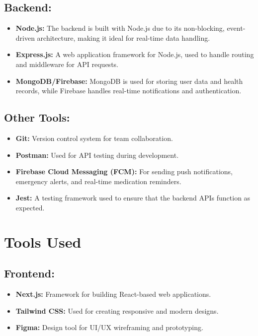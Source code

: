 \subsection*{Backend:}
\begin{itemize}
    \item \textbf{Node.js:} The backend is built with Node.js due to its non-blocking, event-driven architecture, making it ideal for real-time data handling\cite{nodejs_docs}.
    \item \textbf{Express.js:} A web application framework for Node.js, used to handle routing and middleware for API requests\cite{express_docs}.
    \item \textbf{MongoDB/Firebase:} MongoDB is used for storing user data and health records, while Firebase handles real-time notifications and authentication\cite{mongodb_docs}.
\end{itemize}

\subsection*{Other Tools:}
\begin{itemize}
    \item \textbf{Git:} Version control system for team collaboration\cite{git_docs}.
    \item \textbf{Postman:} Used for API testing during development\cite{postman_docs}.
    \item \textbf{Firebase Cloud Messaging (FCM):} For sending push notifications, emergency alerts, and real-time medication reminders\cite{firebase_fcm}.
    \item \textbf{Jest:} A testing framework used to ensure that the backend APIs function as expected\cite{jest_docs}.
\end{itemize}

\section{Tools Used}

\subsection*{Frontend:}
\begin{itemize}
    \item \textbf{Next.js:} Framework for building React-based web applications.
    \item \textbf{Tailwind CSS:} Used for creating responsive and modern designs.
    \item \textbf{Figma:} Design tool for UI/UX wireframing and prototyping.
\end{itemize}

